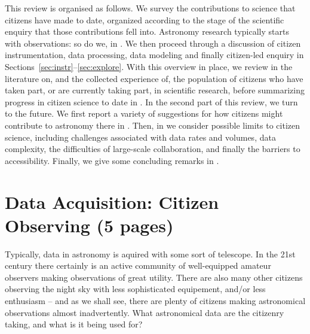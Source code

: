 \documentclass{ar2e}
\begin{document}
% 

This review is organised as follows. We survey the contributions to science that
citizens have made to date, organized according to the stage of the scientific
enquiry that those contributions fell into. Astronomy research typically starts
with observations: so do we, in . We then proceed through a
discussion of citizen instrumentation, data processing, data modeling and
finally citizen-led enquiry in 
Sections~\ref{sec:instr}--\ref{sec:explore}. With this overview in place,
we review in  the literature on, and the collected experience
of, the population of citizens who have taken part, or are currently taking
part, in scientific research, before summarizing progress in citizen science to
date in . In the second part of this review, we turn to the
future. We first report a variety of suggestions for how
citizens might contribute to astronomy there in . Then, in 
 we consider possible limits to citizen science, including
challenges associated with data rates and volumes, data complexity, the
difficulties of large-scale collaboration, and finally the barriers to
accessibility. Finally, we give some concluding remarks in
.



\section{Data Acquisition: Citizen Observing (5 pages)}
\label{sec:obs}

Typically, data in astronomy is aquired with some sort of telescope. In the 21st
century there certainly is an active community of well-equipped amateur
observers making observations of great utility. There are also many other
citizens observing the night sky with less sophisticated equipement, and/or less
enthusiasm -- and as we shall see, there are plenty of citizens making 
astronomical observations almost inadvertently. What astronomical data are the
citizenry taking, and what is it being used for?
\end{document}
